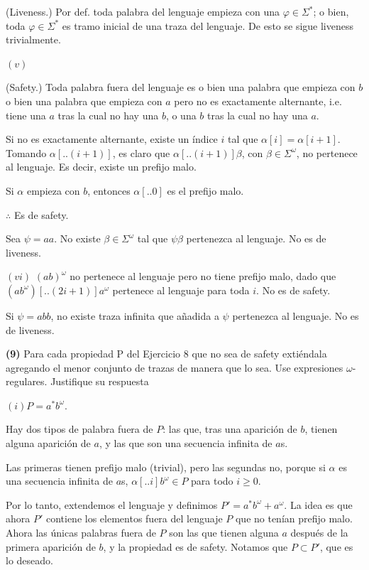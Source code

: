 \documentclass[a4paper, 12pt]{article}
\begin{document}
(Liveness.) Por def. toda palabra del lenguaje empieza con una $\varphi \in
\Sigma^*$; o bien, toda $\varphi \in \Sigma^*$ es tramo inicial de una traza del
lenguaje. De esto se sigue liveness trivialmente.

$(v)$ 


(Safety.) Toda palabra fuera del lenguaje es o bien una palabra que empieza con
$b$ o bien una palabra que empieza con $a$ pero no es exactamente alternante, i.e. 
tiene una $a$ tras la cual no hay una $b$, o una $b$ tras la cual no hay una
$a$. 

Si no es exactamente alternante, existe un índice $i$ tal que $\alpha[i] =
\alpha[i+1]$. Tomando $\alpha[..(i+1)]$, es claro que $\alpha[..(i+1)]\beta$,
con $\beta \in \Sigma^\omega$, no pertenece al lenguaje. Es decir, existe un
prefijo malo. 

Si $\alpha$ empieza con $b$, entonces $\alpha[..0]$ es el prefijo malo.

$\therefore $ Es de safety. 

Sea $\psi = aa$. No existe $\beta \in \Sigma^\omega$ tal que $\psi\beta$
pertenezca al lenguaje. No es de liveness.

$(vi)$ $(ab)^\omega$ no pertenece al lenguaje pero no tiene prefijo malo, dado que
$(ab^\omega)[..(2i+1)]a^\omega$ pertenece al lenguaje para toda $i$. No es de safety.

Si $\psi = abb$, no existe traza infinita que añadida a $\psi$ pertenezca al
lenguaje. No es de liveness.

\pagebreak 

\begin{myframe}
    \textbf{(9)} Para cada propiedad P del Ejercicio 8 que no sea de safety extiéndala
    agregando el menor conjunto de trazas de manera que lo sea. Use expresiones
    $\omega$-regulares. Justifique su respuesta
\end{myframe}



$(i) P = a^* b^\omega$.

Hay dos tipos de palabra fuera de $P$: las que, tras una aparición de $b$,
tienen alguna aparición de $a$, y las que son una secuencia infinita de $a$s.

Las primeras tienen prefijo malo (trivial), pero las segundas no, porque
si $\alpha$ es una secuencia infinita de $a$s, $\alpha[..i]b^\omega \in P$ para
todo $i \geq 0$. 

Por lo tanto, extendemos el lenguaje y definimos $P' = a^*b^\omega + a^\omega$.
La idea es que ahora $P'$ contiene los elementos fuera del lenguaje $P$ que no
tenían prefijo malo. Ahora las únicas palabras fuera de $P$ son las que tienen
alguna $a$ después de la primera aparición de $b$, y la propiedad es de safety.
Notamos que $P \subset P'$, que es lo deseado.
\end{document}

